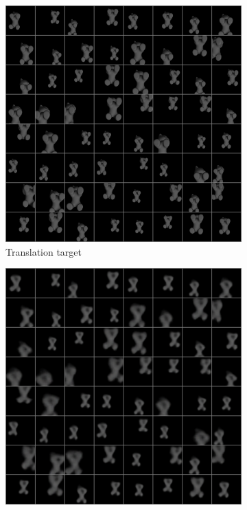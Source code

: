 \documentclass[10pt,a4paper]{article}
\begin{document}
\begin{figure}[!ht]
\begin{subfigure}{0.3\textwidth}
	\centering	
	\includegraphics[width=\textwidth]{cat_target1.png}
	\caption{Translation target}
	\label{cat_t}
\end{subfigure}
\begin{subfigure}{0.3\textwidth}
	\centering	
	\includegraphics[width=\textwidth]{cat_4_output1.png}

\end{subfigure}
\end{figure}
\end{document}
